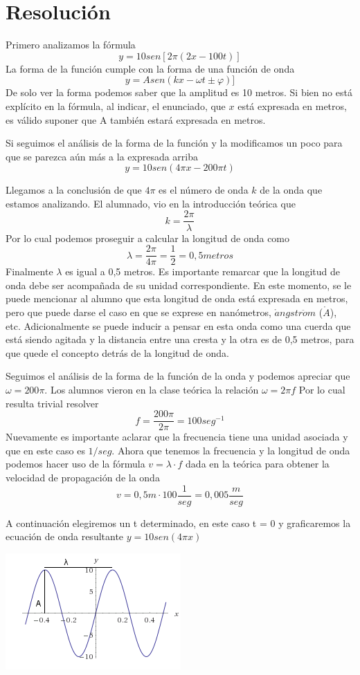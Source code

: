 \documentclass[spanish] {article}
\begin{document}
\section{Resolución}
Primero analizamos la fórmula
$$y = 10 sen [2 \pi (2x- 100 t)]$$
La forma de la función cumple con la forma de una función de onda
$$y = A sen (kx- \omega t \pm \varphi)]$$
De solo ver la forma podemos saber que la amplitud es 10 metros. Si bien no está explícito en la fórmula, al indicar, el enunciado, que $x$ está expresada en metros, es válido suponer que A también estará expresada en metros.

Si seguimos el análisis de la forma de la función y la modificamos un poco para que se parezca aún más a la expresada arriba
$$y = 10 sen  (4 \pi x- 200 \pi t)$$

Llegamos a la conclusión de que $4 \pi$ es el número de onda $k$ de la onda que estamos analizando. El alumnado, vio en la introducción teórica que 
$$ k = \frac{2\pi}{\lambda}$$
Por lo cual podemos proseguir a calcular la longitud de onda como
$$ \lambda = \frac{2\pi}{4\pi} = \frac{1}{2} = 0,5 metros$$ 
Finalmente $\lambda$ es igual a 0,5 metros. Es importante remarcar que la longitud de onda debe ser acompañada de su unidad correspondiente. En este momento, se le puede mencionar al alumno que esta longitud de onda está expresada en metros, pero que puede darse el caso en que se exprese en nanómetros, $\mathring{a}ngstr\ddot{o}m$ ($\mathring{A}$), etc.
Adicionalmente se puede inducir a pensar en esta onda como una cuerda que está siendo agitada y la distancia entre una cresta y la otra es de 0,5 metros, para que quede el concepto detrás de la longitud de onda.

Seguimos el análisis de la forma de la función de la onda y podemos apreciar que $ \omega = 200 \pi $. Los alumnos vieron en la clase teórica la relación $ \omega = 2 \pi f $
Por lo cual resulta trivial resolver
$$ f = \frac{200 \pi}{2 \pi} = 100 seg^{-1}$$
Nuevamente es importante aclarar que la frecuencia tiene una unidad asociada y que en este caso es $1/seg$.
Ahora que tenemos la frecuencia y la longitud de onda podemos hacer uso de la fórmula $v = \lambda \cdot f$ dada en la teórica para obtener la velocidad de propagación de la onda
$$v = 0,5m \cdot 100 \frac{1}{seg} = 0,005 \frac{m}{seg}$$

A continuación elegiremos un t determinado, en este caso t = 0 y graficaremos la ecuación de onda resultante $y=10 sen(4 \pi x)$

\includegraphics{plot2}
\end{document}
